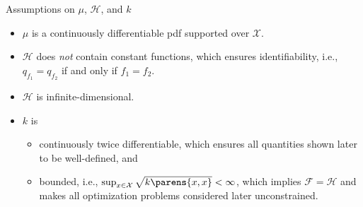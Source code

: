 \documentclass[aspectratio=169,xcolor=dvipsnames]{beamer}
\newcommand{\calH}{\mathcal{H}}
\newcommand{\calX}{\mathcal{X}}
\begin{document}
%	
%
%	
%	
%	
%


\begin{frame}{Assumptions on $\mu$, $\mathcal{H}$, and $k$}
	
	\begin{itemize}
		\item $\mu$ is a continuously differentiable pdf supported over $\calX$. 
		
		\vspace{5pt}
		
		\item $\mathcal{H}$ does \emph{not} contain constant functions, which ensures identifiability, i.e., $q_{f_1} = q_{f_2}$ if and only if $f_1 = f_2$. 
		
		\vspace{5pt}
		
		\item $\calH$ is infinite-dimensional. 
		
		\vspace{5pt}
		
		\item $k$ is 
		\begin{itemize}
			\item continuously twice differentiable, which ensures all quantities shown later to be well-defined, and 
			\item bounded, i.e., $\sup_{x \in \mathcal{X}} \sqrt{k \parens{x, x}} < \infty$, which implies $\mathcal{F} = \mathcal{H}$ and makes all optimization problems considered later unconstrained.
		\end{itemize}
		
	\end{itemize}
	
\end{frame}
\end{document}
